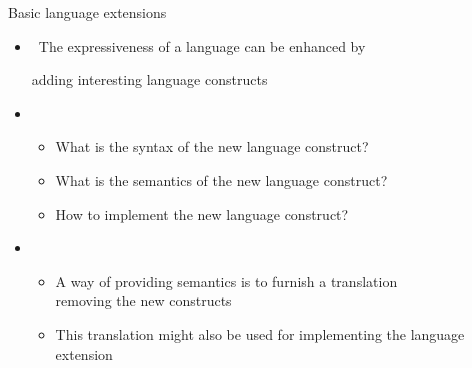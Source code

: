 \begin{frame}[c]{Basic language extensions}
  \bigskip
  \begin{itemize}
  \item {} \ The expressiveness of a language can be enhanced by

    adding interesting language constructs
    \medskip
  \item<2-> 
    \smallskip
    \begin{itemize}\normalsize
    \item What is the \alert{syntax} of the new language construct?
    \item What is the \alert{semantics} of the new language construct?
    \item How to \alert{implement} the new language construct?
    \end{itemize}
    \medskip
  \item <3-> 
    \smallskip
    \begin{itemize}\normalsize
    \item A way of providing semantics is to furnish a \alert{translation}\\ removing the new constructs
      \smallskip
    \item This translation might also be used for implementing the language extension
  \end{itemize}
\end{itemize}
\end{frame}
%
